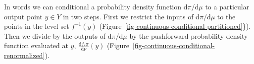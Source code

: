 \documentclass[
  letterpaper,
  DIV=11,
  numbers=noendperiod]{scrartcl}
\begin{document}
In words we can conditional a probability density function
\(\mathrm{d} \pi / \mathrm{d} \mu\) to a particular output point
\(y \in Y\) in two steps. First we restrict the inputs of
\(\mathrm{d} \pi / \mathrm{d} \mu\) to the points in the level set
\(f^{-1}(y)\) (Figure~\ref{fig-continuous-conditional-partitioned}\}).
Then we divide by the outputs of \(\mathrm{d} \pi / \mathrm{d} \mu\) by
the pushforward probability density function evaluated at \(y\),
\(\frac{ \mathrm{d}  f_{*} \pi }{ \mathrm{d} \nu }(y)\)
(Figure~\ref{fig-continuous-conditional-renormalized}).

\begin{figure}

\begin{minipage}{0.05\linewidth}
~\end{minipage}%
%
\begin{minipage}{0.45\linewidth}


\subcaption{\label{fig-continuous-conditional-initial}}

\end{minipage}%
%
\begin{minipage}{0.45\linewidth}

\centering{

}
\end{minipage}
\end{figure}
\end{document}
